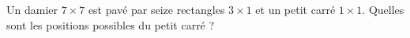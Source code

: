 Un damier $7 \times 7$ est pavé par seize rectangles $3 \times 1$ et un petit carré $1 \times 1$. Quelles sont les positions possibles du petit carré ?
